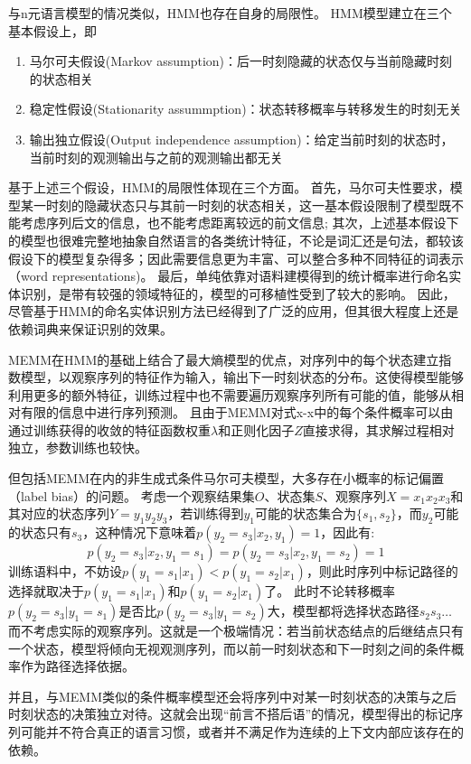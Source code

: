 与n元语言模型的情况类似，HMM也存在自身的局限性。
HMM模型建立在三个基本假设上，即
\begin{enumerate}
    \item 马尔可夫假设(Markov assumption)：后一时刻隐藏的状态仅与当前隐藏时刻的状态相关
    \item 稳定性假设(Stationarity assummption)：状态转移概率与转移发生的时刻无关
    \item 输出独立假设(Output independence assumption)：给定当前时刻的状态时，当前时刻的观测输出与之前的观测输出都无关
\end{enumerate}
基于上述三个假设，HMM的局限性体现在三个方面。
首先，马尔可夫性要求，模型某一时刻的隐藏状态只与其前一时刻的状态相关，这一基本假设限制了模型既不能考虑序列后文的信息，也不能考虑距离较远的前文信息;
其次，上述基本假设下的模型也很难完整地抽象自然语言的各类统计特征，不论是词汇还是句法，都较该假设下的模型复杂得多；因此需要信息更为丰富、可以整合多种不同特征的词表示（word representations)。
最后，单纯依靠对语料建模得到的统计概率进行命名实体识别，是带有较强的领域特征的，模型的可移植性受到了较大的影响。
因此，尽管基于HMM的命名实体识别方法已经得到了广泛的应用，但其很大程度上还是依赖词典来保证识别的效果。

MEMM在HMM的基础上结合了最大熵模型的优点，对序列中的每个状态建立指数模型，以观察序列的特征作为输入，输出下一时刻状态的分布。这使得模型能够利用更多的额外特征，训练过程中也不需要遍历观察序列所有可能的值，能够从相对有限的信息中进行序列预测。
且由于MEMM对式x-x中的每个条件概率可以由通过训练获得的收敛的特征函数权重$\lambda$和正则化因子$Z$直接求得，其求解过程相对独立，参数训练也较快。

但包括MEMM在内的非生成式条件马尔可夫模型，大多存在小概率的标记偏置（label bias）的问题。
考虑一个观察结果集$O$、状态集$S$、观察序列$X = x_1x_2x_3$和其对应的状态序列$Y = y_1y_2y_3$，若训练得到$y_1$可能的状态集合为$\{s_1, s_2\}$，而$y_2$可能的状态只有$s_3$，这种情况下意味着$p(y_2 = s_3|x_2, y_1) = 1$，因此有:
\begin{equation}
    p(y_2 = s_3|x_2, y_1 = s_1) = p(y_2 = s_3|x_2, y_1 = s_2) = 1
\end{equation}
训练语料中，不妨设$p(y_1 = s_1|x_1) < p(y_1 = s_2|x_1)$，则此时序列中标记路径的选择就取决于$p(y_1 = s_1|x_1)$和$p(y_1 = s_2|x_1)$了。
此时不论转移概率$p(y_2 = s_3|y_1 = s_1)$是否比$p(y_2 = s_3|y_1 = s_2)$大，模型都将选择状态路径$s_2s_3\dots$而不考虑实际的观察序列。这就是一个极端情况：若当前状态结点的后继结点只有一个状态，模型将倾向无视观测序列，而以前一时刻状态和下一时刻之间的条件概率作为路径选择依据。

并且，与MEMM类似的条件概率模型还会将序列中对某一时刻状态的决策与之后时刻状态的决策独立对待。这就会出现“前言不搭后语”的情况，模型得出的标记序列可能并不符合真正的语言习惯，或者并不满足作为连续的上下文内部应该存在的依赖。

